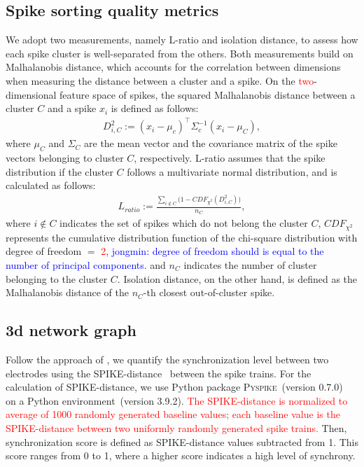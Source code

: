 \documentclass[11pt]{article}
\begin{document}
\subsection{Spike sorting quality metrics}
We adopt two measurements, namely L-ratio and isolation distance, 
to assess how each spike cluster is well-separated from the others.
Both measurements build on Malhalanobis distance, which accounts for the correlation between dimensions when measuring the distance between a cluster and a spike.
On the \textcolor{red}{two}-dimensional feature space of spikes,
the squared Malhalanobis distance between a cluster $C$ and a spike $x_i$  is defined as follows:
\begin{align*}
	D_{i,C}^2:= (x_i-\mu_c)^\top
	\Sigma_c^{-1}
	(x_i-\mu_C),
\end{align*}
where $\mu_C$ and $\Sigma_C$ are the mean vector and the covariance matrix of the spike vectors belonging to cluster $C$, respectively.
L-ratio assumes that the spike distribution if the cluster $C$ follows a multivariate normal distribution, and is calculated as follows:
\begin{align*}
	L_{ratio} :=
	\frac{\sum_{i \notin C}
	\bigl(1-CDF_{\chi^2}(D_{i,C}^2)
	\bigr)}
	{n_C},
\end{align*}
where $i \notin C$ indicates the set of spikes which do not belong the  cluster $C$,
$CDF_{\chi^2}$ represents the cumulative distribution function of the chi-square  distribution with degree of freedom $=$ \textcolor{red}{2},
\textcolor{blue}{jongmin: degree of freedom should is equal to the number of principal components.}
and $n_C$ indicates the number of cluster belonging to the cluster $C$.
Isolation distance, on the other hand, is defined as the Malhalanobis distance of the $n_C$-th closest out-of-cluster spike.



\subsection{3d network graph}
Follow the approach of \cite{lam_tissue-specific_2019},
we quantify the synchronization level between two electrodes using the SPIKE-distance~\citep{kreuz_monitoring_2013} between the spike trains.
For the calculation of SPIKE-distance, we use Python package \textsc{Pyspike}~(version 0.7.0)~\cite{mulansky_pyspikepython_2016} on a Python environment~(version 3.9.2).
\textcolor{red}{The SPIKE-distance is normalized to average of 1000 randomly generated baseline values; each baseline value is the SPIKE-distance between two uniformly randomly generated spike trains.}
Then, synchronization score is defined as SPIKE-distance values subtracted from 1.
This score ranges from 0 to 1, where a higher score indicates a high level of synchrony.
\end{document}
